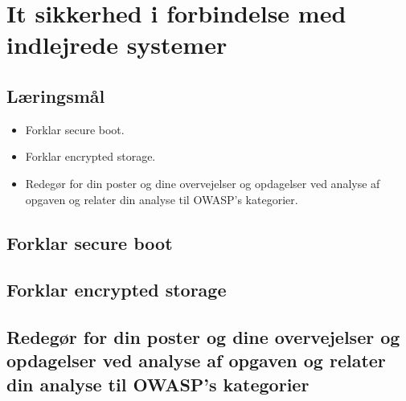 \section{It sikkerhed i forbindelse med indlejrede systemer}

\subsection{Læringsmål}

\begin{itemize}
	\item Forklar secure boot.
	\item Forklar encrypted storage.
	\item Redegør for din poster og dine overvejelser og opdagelser ved analyse af opgaven og relater din analyse til OWASP’s kategorier.
\end{itemize}

\subsection{Forklar secure boot}
\subsection{Forklar encrypted storage}
\subsection{Redegør for din poster og dine overvejelser og opdagelser ved analyse af opgaven og relater din analyse til OWASP’s kategorier}
